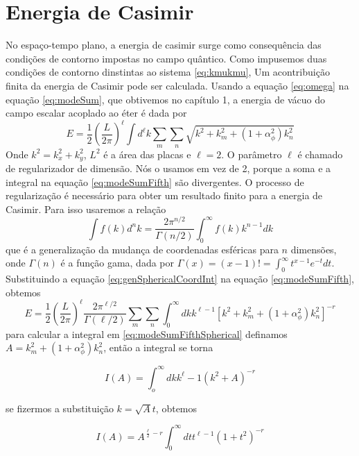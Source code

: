 \section{Energia de Casimir}
No espaço-tempo plano, a energia de casimir surge como consequência das condições de contorno impostas no campo quântico. Como impusemos duas condições de contorno dinstintas ao sistema \eqref{eq:kmukmu}, Um acontribuição finita da energia de Casimir pode ser calculada. Usando a equação \eqref{eq:omega} na equação \eqref{eq:modeSum}, que obtivemos no capítulo 1, a energia de vácuo do campo escalar acoplado ao éter é dada por
\begin{equation}
    E = \frac{1}{2} \left( \frac{L}{2 \pi} \right)^\ell \int d^\ell k \sum_m \sum_n \sqrt{k^2 + k_m^2 + (1+\alpha_\phi^2)k_n^2} \label{eq:modeSumFifth}
\end{equation}
Onde $k^2= k_x^2 + k_y^2$, $L^2$ é a área das placas e $\ell=2$. O parâmetro $\ell$ é chamado de regularizador de dimensão. Nós o usamos em vez de 2, porque a soma e a integral na equação \eqref{eq:modeSumFifth} são divergentes. O processo de regularização é necessário para obter um resultado finito para a energia de Casimir. Para isso usaremos a relação 
\begin{equation}
    \int f(k)d^nk = \frac{2\pi^{n/2}}{\Gamma(n/2)} \int_0^\infty f(k) k^{n-1} dk \label{eq:genSphericalCoordInt}
\end{equation}
que é a generalização da mudança de coordenadas esféricas para $n$ dimensões, onde $\Gamma(n)$ é a função gama, dada por $ \Gamma(x) = (x-1)! =  \int_0^\infty t^{x-1} e^{-t} dt $. Substituindo a equação \eqref{eq:genSphericalCoordInt} na equação \eqref{eq:modeSumFifth}, obtemos
\begin{equation}
    E = \frac{1}{2} \left( \frac{L}{2 \pi} \right)^\ell \frac{2\pi^{\ell/2}}{\Gamma(\ell/2)} \sum_m \sum_n \int_0^\infty dk k^{\ell-1} [k^2 + k_m^2 + (1+\alpha_\phi^2)k_n^2]^{-r} \label{eq:modeSumFifthSpherical}
\end{equation}
para calcular a integral em \eqref{eq:modeSumFifthSpherical} definamos $A = k_m^2 + (1+\alpha_\phi^2)k_n^2$, então a integral se torna

\begin{equation}
    I(A) =  \int_o^\infty dkk^\ell-1 (k^2 + A)^{-r}
\end{equation}

se fizermos a substituição $k=\sqrt{A}t$, obtemos

\begin{equation}
    I(A) = A^{\frac{\ell}{2}-r} \int_0^\infty dt t^{\ell-1} (1 + t^2)^{-r}
\end{equation}

